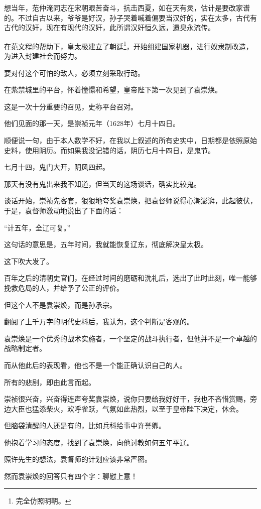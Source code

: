 \begin{multicols}{\theparacolNo}
想当年，范仲淹同志在宋朝艰苦奋斗，抗击西夏，如在天有灵，估计是要改家谱的。不过自古以来，爷爷是好汉，孙子哭着喊着偏要当汉奸的，实在太多，古代有古代的汉奸，现在有现代的汉奸，此所谓汉奸恒久远，遗臭永流传。

在范文程的帮助下，皇太极建立了朝廷\footnote{完全仿照明朝。}，开始组建国家机器，进行奴隶制改造，为进入封建社会而努力。

要对付这个可怕的敌人，必须立刻采取行动。

在紫禁城里的平台，怀着憧憬和希望，皇帝陛下第一次见到了袁崇焕。

这是一次十分重要的召见，史称平台召对。

他们见面的那一天，是崇祯元年（1628年）七月十四日。

顺便说一句，由于本人数学不好，在我以上叙述的所有史实中，日期都是依照原始史料，使用阴历。而如果我没记错的话，阴历七月十四日，是鬼节。

七月十四，鬼门大开，阴风四起。

那天有没有鬼出来我不知道，但当天的这场谈话，确实比较鬼。

谈话开始，崇祯先客套，狠狠地夸奖袁崇焕，把袁督师说得心潮澎湃，此起彼伏，于是，袁督师激动地说出了下面的话：

“计五年，全辽可复。”

这句话的意思是，五年时间，我就能恢复辽东，彻底解决皇太极。

这下吹大发了。

百年之后的清朝史官们，在经过时间的磨砺和洗礼后，选出了此时此刻，唯一能够挽救危局的人，并给予了公正的评价。

但这个人不是袁崇焕，而是孙承宗。

翻阅了上千万字的明代史料后，我认为，这个判断是客观的。

袁崇焕是一个优秀的战术实施者，一个坚定的战斗执行者，但他并不是一个卓越的战略制定者。

而从他此后的表现看，他也不是一个能正确认识自己的人。

所有的悲剧，即由此言而起。

崇祯很兴奋，兴奋得连声夸奖袁崇焕，说你只要给我好好干，我也不吝惜赏赐，旁边大臣也猛添柴火，欢呼雀跃，气氛如此热烈，以至于皇帝陛下决定，休会。

但脑袋清醒的人还是有的，比如兵科给事中许誉卿。

他抱着学习的态度，找到了袁崇焕，向他讨教如何五年平辽。

照许先生的想法，袁督师的计划应该非常严密。

然而袁崇焕的回答只有四个字：聊慰上意！


\end{multicols}
